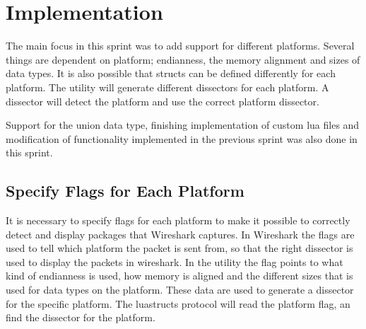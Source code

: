 \begin{table}[htbp] \footnotesize \center
\caption{User Stories - Sprint 3 Part 4\label{tab:req:stories10}}
\noindent{}
\end{table}


\section{Implementation}
\label{sec:sp3:impl}
The main focus in this sprint was to add support for different platforms. Several 
things are dependent on platform; \gls{endianness}, the memory alignment and sizes 
of data types. It is also possible that \glspl{struct} can be defined differently for 
each platform. The \gls{utility} will generate different \glspl{dissector} for each 
platform. A \gls{dissector} will detect the platform and use the correct 
platform \gls{dissector}.

Support for the \gls{union} data type, finishing implementation of custom \Gls{lua} files 
and modification of functionality implemented in the previous sprint was also 
done in this sprint.

\subsection{Specify Flags for Each Platform}
It is necessary to specify flags for each platform to make it possible to 
correctly detect and display packages that Wireshark captures. In Wireshark
the flags are used to tell which platform the \gls{packet} is sent from, so that 
the right \gls{dissector} is used to display the \glspl{packet} in \Gls{wireshark}. In the 
\gls{utility} the flag points to what kind of \gls{endianness} is used, how memory is aligned and 
the different sizes that is used for data types on the platform. These data 
are used to generate a \gls{dissector} for the specific platform. The 
luastructs protocol will read the platform flag, an find the dissector for the 
platform.


